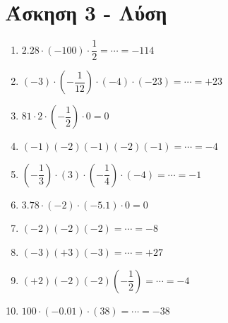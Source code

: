 \documentclass[a4paper,10pt]{report}
\begin{document}

\section*{Άσκηση 3 - Λύση\hfill \small{}}
\begin{multicols}{2}
\begin{enumerate}[1)]
 \item $2.28\cdot(-100)\cdot \dfrac{1}{2}=\cdots =-114$
 \item $(-3)\cdot(-\dfrac{1}{12})\cdot(-4)\cdot(-23)=\cdots=+23$
 \item $81\cdot2\cdot(-\dfrac{1}{2})\cdot0=0$
 \item $(-1)(-2)(-1)(-2)(-1)=\cdots=-4$
 \item $(-\dfrac{1}{3})\cdot(3)\cdot(-\dfrac{1}{4})\cdot(-4)=\cdots=-1$
 \item $3.78\cdot(-2)\cdot(-5.1)\cdot0=0$
 \item $(-2)(-2)(-2)=\cdots=-8$
 \item $(-3)(+3)(-3)=\cdots=+27$
 \item $(+2)(-2)(-2)(-\dfrac{1}{2})=\cdots =-4$
 \item $100\cdot(-0.01)\cdot(38)=\cdots =-38$
\end{enumerate}
\end{multicols}
\end{document}
